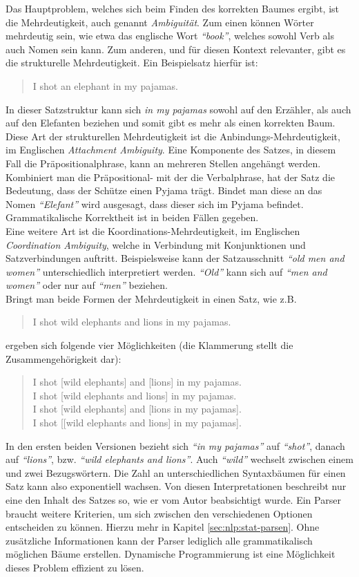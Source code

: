 Das Hauptproblem, welches sich beim Finden des korrekten Baumes ergibt, ist die Mehrdeutigkeit, auch genannt \textit{Ambiguität}. Zum einen können Wörter mehrdeutig sein, wie etwa das englische Wort \textit{``book''}, welches sowohl Verb als auch Nomen sein kann. Zum anderen, und für diesen Kontext relevanter, gibt es die strukturelle Mehrdeutigkeit. Ein Beispielsatz hierfür ist: 
\begin{quote}
I shot an elephant in my pajamas.
\end{quote}
In dieser Satzstruktur kann sich \textit{in my pajamas} sowohl auf den Erzähler, als auch auf den Elefanten beziehen und somit gibt es mehr als einen korrekten Baum. \\ 
Diese Art der strukturellen Mehrdeutigkeit ist die Anbindungs-Mehrdeutigkeit, im Englischen \textit{Attachment Ambiguity}. Eine Komponente des Satzes, in diesem Fall die Präpositionalphrase, kann an mehreren Stellen angehängt werden. Kombiniert man die Präpositional- mit der die Verbalphrase, hat der Satz die Bedeutung, dass der Schütze einen Pyjama trägt. Bindet man diese an das Nomen \textit{``Elefant''} wird ausgesagt, dass dieser sich im Pyjama befindet. Grammatikalische Korrektheit ist in beiden Fällen gegeben. \\
Eine weitere Art ist die Koordinations-Mehrdeutigkeit, im Englischen \textit{Coordination Ambiguity}, welche in Verbindung mit Konjunktionen und Satzverbindungen auftritt. Beispielsweise kann der Satzausschnitt \textit{``old men and women''} unterschiedlich interpretiert werden. \textit{``Old''} kann sich auf \textit{``men and women''} oder nur auf \textit{``men''} beziehen. \\
Bringt man beide Formen der Mehrdeutigkeit in einen Satz, wie z.B. 
\begin{quote}
I shot wild elephants and lions in my pajamas.
\end{quote}
ergeben sich folgende vier Möglichkeiten (die Klammerung stellt die Zusammengehörigkeit dar): %
\begin{quote}
I shot [wild elephants] and [lions] in my pajamas.\\
I shot [wild elephants and lions] in my pajamas.\\
I shot [wild elephants] and [lions in my pajamas].\\
I shot [[wild elephants and lions] in my pajamas].\\
\end{quote}
In den ersten beiden Versionen bezieht sich \textit{``in my pajamas''} auf \textit{``shot''}, danach auf \textit{``lions''}, bzw. \textit{``wild elephants and lions''}. Auch \textit{``wild''} wechselt zwischen einem und zwei Bezugswörtern. Die Zahl an unterschiedlichen Syntaxbäumen für einen Satz kann also exponentiell wachsen. %
Von diesen Interpretationen beschreibt nur eine den Inhalt des Satzes so, wie er vom Autor beabsichtigt wurde. Ein Parser braucht weitere Kriterien, um sich zwischen den verschiedenen Optionen entscheiden zu können. Hierzu mehr in Kapitel \ref{sec:nlp:stat-parsen}. Ohne zusätzliche Informationen kann der Parser lediglich alle grammatikalisch möglichen Bäume erstellen. Dynamische Programmierung ist eine Möglichkeit dieses Problem effizient zu lösen.

